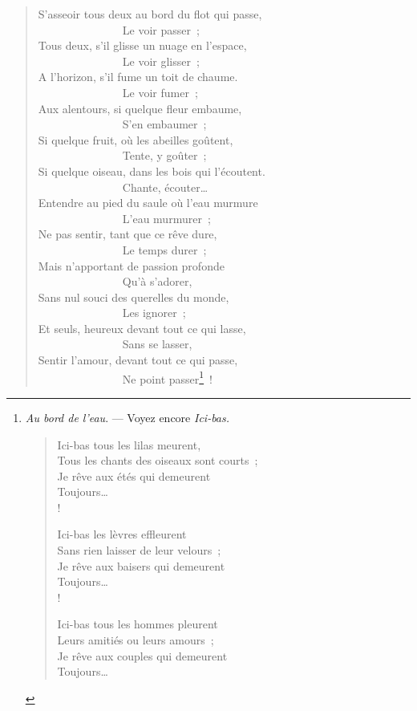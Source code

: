 \documentclass[french,twoside]{book} %
\begin{document}
\begin{verse}
S’asseoir tous deux au bord du flot qui passe,\\
               Le voir passer ;\\
Tous deux, s’il glisse un nuage en l’espace,\\
               Le voir glisser ;\\
A l’horizon, s’il fume un toit de chaume.\\
               Le voir fumer ;\\
Aux alentours, si quelque fleur embaume,\\
               S’en embaumer ;\\
Si quelque fruit, où les abeilles goûtent,\\
               Tente, y goûter ;\\
Si quelque oiseau, dans les bois qui l’écoutent.\\
               Chante, écouter…\\
Entendre au pied du saule où l’eau murmure\\
               L’eau murmurer ;\\
Ne pas sentir, tant que ce rêve dure,\\
               Le temps durer ;\\
Mais n’apportant de passion profonde\\
               Qu’à s’adorer,\\
Sans nul souci des querelles du monde,\\
               Les ignorer ;\\
Et seuls, heureux devant tout ce qui lasse,\\
               Sans se lasser,\\
Sentir l’amour, devant tout ce qui passe,\\
               Ne point passer\footnote{\noindent \emph{Au bord de l’eau}. — Voyez encore \emph{Ici-bas.}\par
 
\begin{verse}
Ici-bas tous les lilas meurent,\\
Tous les chants des oiseaux sont courts ;\\
Je rêve aux étés qui demeurent\\
Toujours…\\!

Ici-bas les lèvres effleurent\\
Sans rien laisser de leur velours ;\\
Je rêve aux baisers qui demeurent\\
Toujours…\\!

Ici-bas tous les hommes pleurent\\
Leurs amitiés ou leurs amours ;\\
Je rêve aux couples qui demeurent\\
Toujours…\\
\end{verse}
} !\\
\end{verse}
\end{document}
